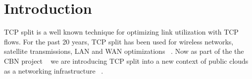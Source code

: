 \section{Introduction}
TCP split is a well known technique for optimizing link utilization with TCP flows. For the past 20 years, TCP split has been used for wireless networks, satellite transmissions, LAN and WAN optimizations ~\cite{chakravorty2003aggregation, le2015experiences,luglio2004,siracusano2016miniproxy,kernelsplit}. 
Now as part of the the CBN project ~\cite{Elastic} we are introducing TCP split into a new context of public clouds as a networking infrastructure ~\cite{CDD}. 